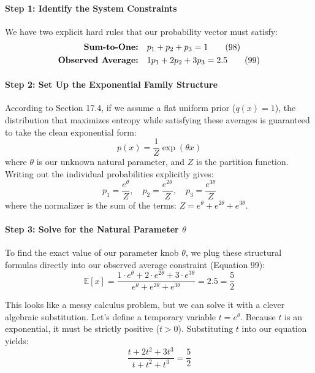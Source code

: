 \documentclass{article}
\begin{document}
\paragraph{Step 1: Identify the System Constraints}
We have two explicit hard rules that our probability vector must satisfy:
\begin{align}
\text{\textbf{Sum-to-One:}} \quad & p_1 + p_2 + p_3 = 1 \tag{98} \\
\text{\textbf{Observed Average:}} \quad & 1p_1 + 2p_2 + 3p_3 = 2.5 \tag{99}
\end{align}

\paragraph{Step 2: Set Up the Exponential Family Structure}
According to Section 17.4, if we assume a flat uniform prior ($q(x)=1$), the distribution that maximizes entropy while satisfying these averages is guaranteed to take the clean exponential form:
\begin{equation}
p(x) = \frac{1}{Z} \exp(\theta x) \tag{100}
\end{equation}
where $\theta$ is our unknown natural parameter, and $Z$ is the partition function. Writing out the individual probabilities explicitly gives:
\begin{equation*}
p_1 = \frac{e^\theta}{Z}, \quad p_2 = \frac{e^{2\theta}}{Z}, \quad p_3 = \frac{e^{3\theta}}{Z}
\end{equation*}
where the normalizer is the sum of the terms: $Z = e^\theta + e^{2\theta} + e^{3\theta}$.

\paragraph{Step 3: Solve for the Natural Parameter $\theta$}
To find the exact value of our parameter knob $\theta$, we plug these structural formulas directly into our observed average constraint (Equation 99):
\begin{equation}
\mathbb{E}[x] = \frac{1 \cdot e^\theta + 2 \cdot e^{2\theta} + 3 \cdot e^{3\theta}}{e^\theta + e^{2\theta} + e^{3\theta}} = 2.5 = \frac{5}{2} \tag{101}
\end{equation}

This looks like a messy calculus problem, but we can solve it with a clever algebraic substitution. Let's define a temporary variable $t = e^\theta$. Because $t$ is an exponential, it must be strictly positive ($t > 0$). Substituting $t$ into our equation yields:
\begin{equation}
\frac{t + 2t^2 + 3t^3}{t + t^2 + t^3} = \frac{5}{2} \tag{102}
\end{equation}
\end{document}
